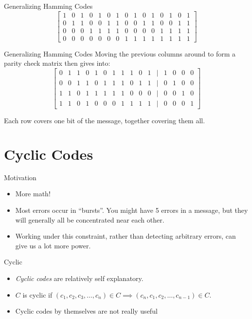 \documentclass[aspectratio=169]{beamer}
\begin{document}
\setcounter{MaxMatrixCols}{20}
\begin{frame}{Generalizing Hamming Codes}
    $$\begin{bmatrix}
        1 & 0 & 1 & 0 & 1 & 0 & 1 & 0 & 1 & 0 & 1 & 0 & 1 & 0 & 1 \\
        0 & 1 & 1 & 0 & 0 & 1 & 1 & 0 & 0 & 1 & 1 & 0 & 0 & 1 & 1 \\
        0 & 0 & 0 & 1 & 1 & 1 & 1 & 0 & 0 & 0 & 0 & 1 & 1 & 1 & 1 \\
        0 & 0 & 0 & 0 & 0 & 0 & 0 & 1 & 1 & 1 & 1 & 1 & 1 & 1 & 1
    \end{bmatrix}$$
\end{frame}

\begin{frame}{Generalizing Hamming Codes}
    Moving the previous columns around to form a parity check matrix then gives into: 
    $$\begin{bmatrix}
        0 & 1 & 1 & 0 & 1 & 0 & 1 & 1 & 1 & 0 & 1 & | & 1 & 0 & 0 & 0 \\
        0 & 0 & 1 & 1 & 0 & 1 & 1 & 1 & 0 & 1 & 1 & | & 0 & 1 & 0 & 0 \\
        1 & 1 & 0 & 1 & 1 & 1 & 1 & 1 & 0 & 0 & 0 & | & 0 & 0 & 1 & 0 \\
        1 & 1 & 0 & 1 & 0 & 0 & 0 & 1 & 1 & 1 & 1 & | & 0 & 0 & 0 & 1
    \end{bmatrix}$$

    Each row covers one bit of the message, together covering them all. 
\end{frame}

\section{Cyclic Codes}
\frame{\sectionpage}

\begin{frame}{Motivation}
    \begin{itemize}
        \item More math! \pause 
        \item Most errors occur in ``bursts''. You might have 5 errors in a message, but they will generally all be concentrated near each other. \pause 
        \item Working under this constraint, rather than detecting arbitrary errors, can give us a lot more power. 
    \end{itemize}
\end{frame}

\begin{frame}{Cyclic}
\begin{itemize}
    \item \emph{Cyclic codes} are relatively self explanatory. \pause 
    \item $C$ is cyclic if $(c_1, c_2, c_3, \ldots, c_n) \in C \implies (c_n, c_1, c_2, \ldots, c_{n - 1}) \in C$. \pause 
    \item Cyclic codes by themselves are not really useful
\end{itemize}
\end{frame}
\end{document}
